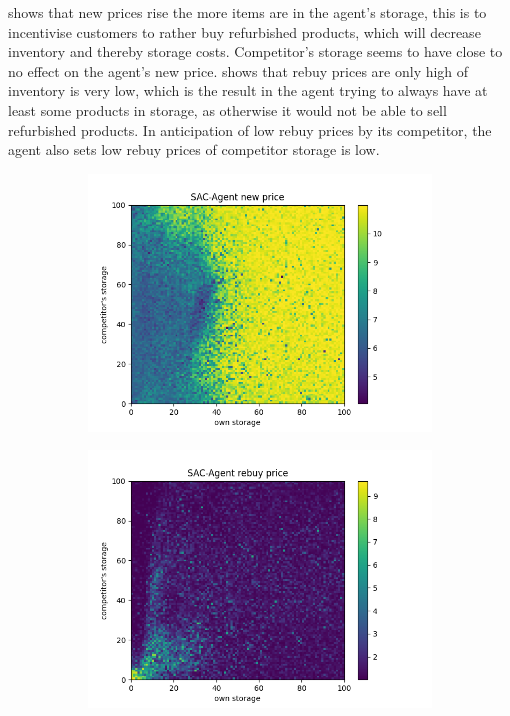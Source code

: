  shows that new prices rise the more items are in the agent's storage, this is to incentivise customers to rather buy refurbished products, which will decrease inventory and thereby storage costs. Competitor's storage seems to have close to no effect on the agent's new price.  shows that rebuy prices are only high of inventory is very low, which is the result in the agent trying to always have at least some products in storage, as otherwise it would not be able to sell refurbished products. In anticipation of low rebuy prices by its competitor, the agent also sets low rebuy prices of competitor storage is low.

\begin{figure}[ht]
	\centering
	\begin{subfigure}[t]{0.49\textwidth}
		\centering
		\includegraphics[width = \textwidth]{images/experiments/SACDuopoly/policyanalyzer/Appendix/both_storage/new_price.png}\\
		\label{fig:AppendixSACDuopolyPolicyanalyser2new}
	\end{subfigure}
	\begin{subfigure}[t]{0.49\textwidth}
		\centering
		\includegraphics[width = \textwidth]{images/experiments/SACDuopoly/policyanalyzer/Appendix/both_storage/rebuy_price.png}\\

\end{subfigure}
\end{figure}
